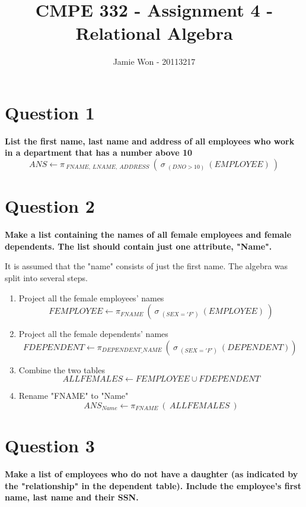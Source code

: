 \documentclass{article}
\title{CMPE 332 - Assignment 4 - Relational Algebra}
\author{Jamie Won - 20113217}
\begin{document}
\setcounter{secnumdepth}{0}
\maketitle
\tableofcontents
\cleardoublepage

\section{Question 1}

    \textbf{List the first name, last name and address of all employees who work in a department that has a number above 10}
    \[ ANS \gets \pi _{\: FNAME, \: LNAME, \: ADDRESS} \: ( \: \sigma \: _{(DNO > 10)} \: (EMPLOYEE) \: )\]

\section{Question 2}

    \textbf{Make a list containing the names of all female employees and female dependents.  The list should contain just one attribute, "Name".}

    It is assumed that the "name" consists of just the first name. The algebra was split into several steps.
    
    \begin{enumerate}
        \item Project all the female employees' names
        \[ FEMPLOYEE \gets \pi _{FNAME} \: ( \: \sigma \: _{(SEX = 'F')} \: (EMPLOYEE) \: )\]
        \item Project all the female dependents' names
        \[ FDEPENDENT \gets \pi _{DEPENDENT\_NAME} \: ( \: \sigma \: _{(SEX = 'F')} \: (DEPENDENT)) \: \]
        \item Combine the two tables
        \[ ALLFEMALES \gets FEMPLOYEE \cup FDEPENDENT \]
        \item Rename "FNAME" to "Name"
        \[ ANS_{Name} \gets \pi _{FNAME} \: ( \: ALLFEMALES \:) \]
    \end{enumerate}
    
\section{Question 3}

    \textbf{Make a list of employees who do not have a daughter (as indicated by the "relationship" in the dependent table).  Include the employee's first name, last name and their SSN.}
\end{document}
